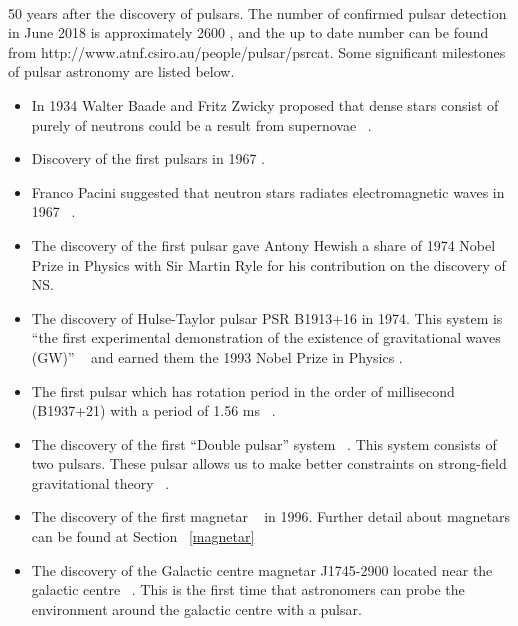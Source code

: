 \documentclass[thesis_msc.tex]{subfiles}
\begin{document}
    \paragraph{} 50 years after the discovery of pulsars. The number of confirmed pulsar detection in June 2018 is approximately 2600 \citep{PSRCAT2}, and the up to date number can be found from http://www.atnf.csiro.au/people/pulsar/psrcat. Some significant milestones of pulsar astronomy are listed below.

\begin{itemize}
\item In 1934 Walter Baade and Fritz Zwicky proposed that dense stars consist of purely of neutrons could be a result from supernovae  ~\citep{baade1934remarks}.  

\item Discovery of the first pulsars in 1967 \citep{HEWISH1968}.

\item Franco Pacini suggested that neutron stars radiates electromagnetic waves in 1967 ~\citep{PACINI1967}. 

\item The discovery of the first pulsar gave  Antony Hewish a share of 1974 Nobel Prize in Physics \citep{HEWISH1968} with Sir Martin Ryle for his contribution on the discovery of NS.

\item The discovery of Hulse-Taylor pulsar PSR B1913+16 in 1974. This system is ``the first experimental demonstration of the existence of gravitational waves (GW)'' ~\citep{handbook} and earned them the 1993 Nobel Prize in Physics \citep{hulse1975discovery}.

\item The first pulsar which has rotation period in the order of millisecond  (B1937+21) with a period of 1.56 ms ~\citep{backer1982millisecond}. 

\item The discovery of the first ``Double pulsar'' system ~\citep{burgay2003increased}. This system consists of two pulsars. These pulsar allows us to make better constraints on strong-field gravitational theory ~\citep{lyne2004double}.

\item The discovery of the first magnetar ~\citep{usov1996persistent} in 1996. Further detail about magnetars can be found at Section ~\ref{magnetar}

\item The discovery of the Galactic centre magnetar J1745-2900 located near the galactic centre ~\citep{kennea2013swift}. This is the first time that astronomers can probe the environment around the galactic centre with a pulsar.  

\end{itemize}
\end{document}
